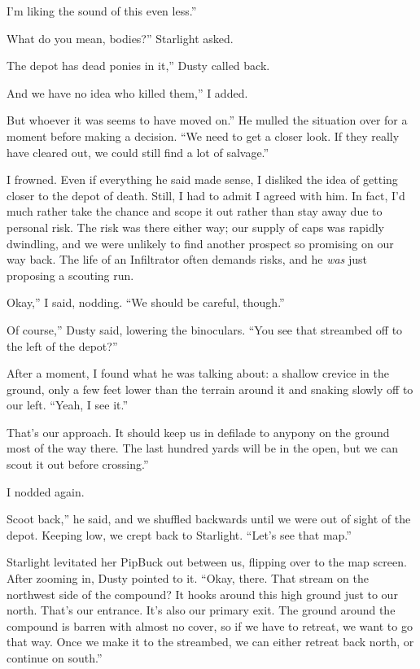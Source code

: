 \leavevmode{}I’m liking the sound of this even less.”

\leavevmode{}What do you mean, bodies?” Starlight asked.

\leavevmode{}The depot has dead ponies in it,” Dusty called back.

\leavevmode{}And we have no idea who killed them,” I added.

\leavevmode{}But whoever it was seems to have moved on.” He mulled the situation over for a moment before making a decision. “We need to get a closer look. If they really have cleared out, we could still find a lot of salvage.”

I frowned. Even if everything he said made sense, I disliked the idea of getting closer to the depot of death. Still, I had to admit I agreed with him. In fact, I’d much rather take the chance and scope it out rather than stay away due to personal risk. The risk was there either way; our supply of caps was rapidly dwindling, and we were unlikely to find another prospect so promising on our way back. The life of an Infiltrator often demands risks, and he \textit{was} just proposing a scouting run.

\leavevmode{}Okay,” I said, nodding. “We should be careful, though.”

\leavevmode{}Of course,” Dusty said, lowering the binoculars. “You see that streambed off to the left of the depot?”

After a moment, I found what he was talking about: a shallow crevice in the ground, only a few feet lower than the terrain around it and snaking slowly off to our left. “Yeah, I see it.”

\leavevmode{}That’s our approach. It should keep us in defilade to anypony on the ground most of the way there. The last hundred yards will be in the open, but we can scout it out before crossing.”

I nodded again.

\leavevmode{}Scoot back,” he said, and we shuffled backwards until we were out of sight of the depot. Keeping low, we crept back to Starlight. “Let’s see that map.”

Starlight levitated her PipBuck out between us, flipping over to the map screen. After zooming in, Dusty pointed to it. “Okay, there. That stream on the northwest side of the compound? It hooks around this high ground just to our north. That’s our entrance. It’s also our primary exit. The ground around the compound is barren with almost no cover, so if we have to retreat, we want to go that way. Once we make it to the streambed, we can either retreat back north, or continue on south.”

